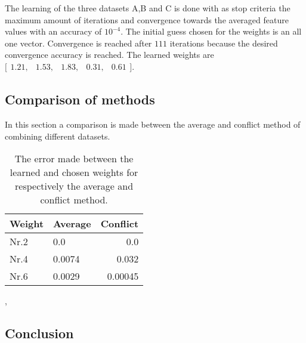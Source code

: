 
 The learning of the three datasets A,B and C is done with as stop criteria the maximum amount of iterations and convergence towards the averaged feature values with an accuracy of $10^{-4}$. The initial guess chosen for the weights is an all one vector. Convergence is reached after $111$ iterations because the desired convergence accuracy is reached. The learned weights are $\bigl[ \begin{smallmatrix} 1.21,&1.53,&1.83,&0.31,&0.61\end{smallmatrix}\bigr]$. 
 

 
 \subsection{Comparison of methods}
 In this section a comparison is made between the average and conflict method of combining different datasets. 
 
 \begin{table}[h!]
 	\centering
 	\begin{tabular}{@{}llr@{}} 
 		Weight    & Average & Conflict\\ \midrule
 		Nr.2      & \hspace{7mm}0.0    & 0.0 \\
 		Nr.4      & \hspace{7mm} 0.0074    & 0.032 \\
 		Nr.6      & \hspace{7mm}0.0029    & 0.00045 \\ \bottomrule
 	\end{tabular}
 	\caption{The error made between the learned and chosen weights for respectively the average and conflict method.}
 	\label{table:error_learned_weights_conflict}
 \end{table}

  , 
 \subsection{Conclusion}




